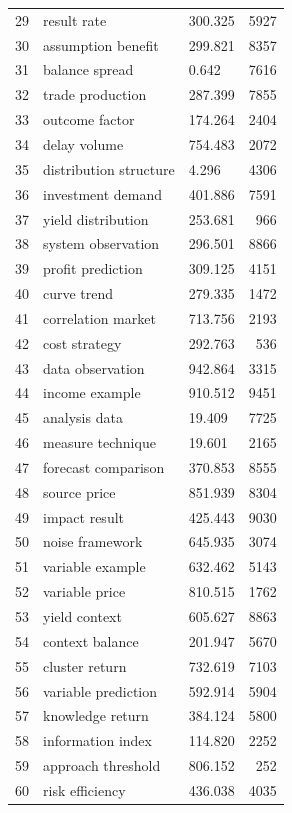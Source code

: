 \documentclass[11pt]{report}
\begin{document}
\begin{longtable}{rllr}
29 & result rate & 300.325 & 5927 \\
30 & assumption benefit & 299.821 & 8357 \\
31 & balance spread & 0.642 & 7616 \\
32 & trade production & 287.399 & 7855 \\
33 & outcome factor & 174.264 & 2404 \\
34 & delay volume & 754.483 & 2072 \\
35 & distribution structure & 4.296 & 4306 \\
36 & investment demand & 401.886 & 7591 \\
37 & yield distribution & 253.681 & 966 \\
38 & system observation & 296.501 & 8866 \\
39 & profit prediction & 309.125 & 4151 \\
40 & curve trend & 279.335 & 1472 \\
41 & correlation market & 713.756 & 2193 \\
42 & cost strategy & 292.763 & 536 \\
43 & data observation & 942.864 & 3315 \\
44 & income example & 910.512 & 9451 \\
45 & analysis data & 19.409 & 7725 \\
46 & measure technique & 19.601 & 2165 \\
47 & forecast comparison & 370.853 & 8555 \\
48 & source price & 851.939 & 8304 \\
49 & impact result & 425.443 & 9030 \\
50 & noise framework & 645.935 & 3074 \\
51 & variable example & 632.462 & 5143 \\
52 & variable price & 810.515 & 1762 \\
53 & yield context & 605.627 & 8863 \\
54 & context balance & 201.947 & 5670 \\
55 & cluster return & 732.619 & 7103 \\
56 & variable prediction & 592.914 & 5904 \\
57 & knowledge return & 384.124 & 5800 \\
58 & information index & 114.820 & 2252 \\
59 & approach threshold & 806.152 & 252 \\
60 & risk efficiency & 436.038 & 4035 \\
\end{longtable}
\end{document}

